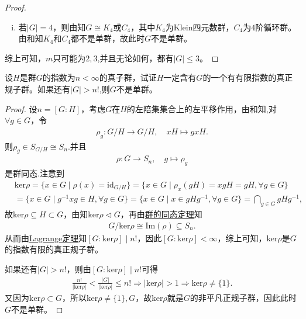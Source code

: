 \documentclass[../../main.tex]{subfiles}%
\begin{document}
\begin{proof}
\begin{enumerate}[(1)]
\begin{enumerate}[(i)]
\item 若$|G|=4$，则由知$G\cong K_4$或$C_4$，其中$K_4$为Klein四元数群，$C_4$为$4$阶循环群。由和知$K_4$和$C_4$都不是单群，故此时$G$不是单群。
\end{enumerate}
\end{enumerate}
综上可知，$m$只可能为$2,3$,并且无论如何，都有$|G|\leqslant 3$。
\end{proof}

\begin{example}
设$H$是群$G$的指数为$n<\infty$的真子群，试证$H$一定含有$G$的一个有有限指数的真正规子群。如果还有$|G|>n!$,则$G$不是单群。
\end{example}
\begin{proof}
设$n=[G:H]$，考虑$G$在$H$的左陪集集合上的左平移作用，由和知,对$\forall g\in G$，令
\begin{align*}
\rho_g:G/H\to G/H,\quad xH\mapsto gxH.
\end{align*}
则$\rho_g\in S_{G/H}\cong S_n$.并且
\begin{align*}
\rho:G\to S_n,\quad g\mapsto \rho_g
\end{align*}
是群同态.注意到
\begin{align*}
&\mathrm{ker}\rho=\{x\in G\mid \rho(x)=\mathrm{id}_{G/H}\}=\{x\in G\mid \rho_x(gH)=xgH=gH,\forall g\in G\}\\
&=\{x\in G\mid g^{-1}xg\in H,\forall g\in G\}=\{x\in G\mid x\in gHg^{-1},\forall g\in G\}=\bigcap\limits_{g\in G}gHg^{-1},
\end{align*}
故$\mathrm{ker}\rho\subseteq H\subset G$，由知$\mathrm{ker}\rho\lhd G$，再由\hyperref[theorem:群的同态基本定理]{群的同态定理}知
\begin{align*}
G/\mathrm{ker}\rho\cong \mathrm{Im}(\rho)\subseteq S_n.
\end{align*}
从而由\hyperref[theorem:抽象代数--Lagrange定理]{Lagrange定理}知$[G:\mathrm{ker}\rho]\mid n!$，因此$[G:\mathrm{ker}\rho]<\infty$，综上可知，$\mathrm{ker}\rho$是$G$的指数有限的真正规子群。

如果还有$|G|>n!$，则由$[G:\mathrm{ker}\rho]\mid n!$可得
\begin{align*}
\frac{n!}{|\mathrm{ker}\rho|}<\frac{|G|}{|\mathrm{ker}\rho|}\leqslant n!\Longrightarrow |\mathrm{ker}\rho|>1\Longrightarrow \mathrm{ker}\rho\neq \{1\}.
\end{align*}
又因为$\mathrm{ker}\rho\subset G$，所以$\mathrm{ker}\rho\neq \{1\},G$，故$\mathrm{ker}\rho$就是$G$的非平凡正规子群，因此此时$G$不是单群。

\end{proof}
\end{document}
